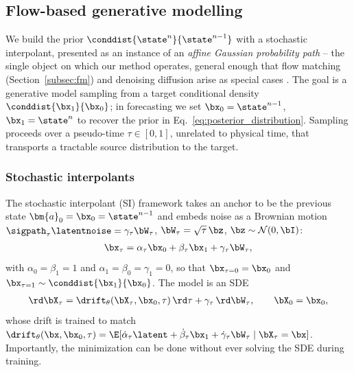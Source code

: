 
\subsection{Flow-based generative modelling}
\label{subsec:flow_models}

We build the prior $\conddist{\state^{n}}{\state^{n-1}}$ with a stochastic interpolant, presented as an instance of an \emph{affine Gaussian probability path} -- the single object on which our method operates, general enough that flow matching (Section~\ref{subsec:fm}) and denoising diffusion arise as special cases \cite{albergo_stochastic_2023, lipman_flow_2023, ma_sit_2024, holderrieth_generator_2024}. The goal is a generative model sampling from a target conditional density $\conddist{\bx_1}{\bx_0}$; in forecasting we set $\bx_0 = \state^{n-1}$, $\bx_1 = \state^{n}$ to recover the prior in Eq.~\eqref{eq:posterior_distribution}. Sampling proceeds over a pseudo-time $\tau\in[0,1]$, unrelated to physical time, that transports a tractable source distribution to the target.

\subsubsection{Stochastic interpolants}
\label{subsec:si}
The stochastic interpolant (SI) framework \cite{albergo_stochastic_2023, chen_probabilistic_2024} takes an anchor to be the previous state $\bm{a}_0=\bx_0=\state^{n-1}$ and embeds noise as a Brownian motion $\sigpath_\tau\latentnoise = \gamma_\tau\bW_\tau$, $\bW_\tau=\sqrt{\tau}\,\bz$, $\bz\sim\mathcal{N}(0,\bI)$:
\begin{align}\label{eq:stochastic_interpolant}
    \bx_\tau = \alpha_\tau\bx_0 + \beta_\tau\bx_1 + \gamma_\tau\bW_\tau,
\end{align}
with $\alpha_0=\beta_1=1$ and $\alpha_1=\beta_0=\gamma_1=0$, so that $\bx_{\tau=0}=\bx_0$ and $\bx_{\tau=1}\sim\conddist{\bx_1}{\bx_0}$. The model is an SDE
\begin{align}\label{eq:SI_SDE}
    \rd\bX_\tau = \drift_\theta(\bX_\tau,\bx_0,\tau)\,\rd\tau + \gamma_\tau\,\rd\bW_\tau, \qquad \bX_0=\bx_0,
\end{align}
whose drift is trained to match $\drift_\theta(\bx,\bx_0,\tau) = \E[\dot\alpha_\tau\latent + \dot\beta_\tau\bx_1 + \dot\gamma_\tau\bW_\tau\mid\bX_\tau=\bx]$. Importantly, the minimization can be done without ever solving the SDE during training.

